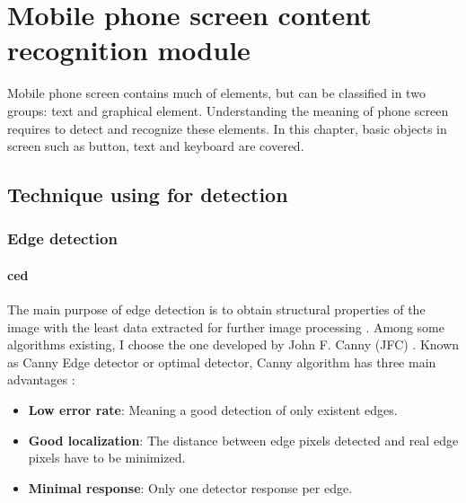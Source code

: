 \chapter{Mobile phone screen content recognition module}
\label{ch:screen_recognize}
Mobile phone screen contains much of elements, but can be classified in two groups: text and graphical element.
Understanding the meaning of phone screen requires to detect and recognize these elements.
In this chapter, basic objects in screen such as button, text and keyboard are covered.

\section{Technique using for detection}
\subsection{Edge detection}
\subsubsection{\acrfull{ced}}
The main purpose of edge detection is to obtain structural properties of the image with the least data extracted for further image processing \cite{canny}. Among some algorithms existing, I choose the one developed by John F. Canny (JFC) \nocite{jfc_canny}. Known as Canny Edge detector or optimal detector, Canny algorithm has three main advantages \cite{code_canny}:
	\begin{itemize}
		\item \textbf{Low error rate}: Meaning a good detection of only existent edges.
		\item \textbf{Good localization}: The distance between edge pixels detected and real edge pixels have to be minimized.
		\item \textbf{Minimal response}: Only one detector response per edge.
	\end{itemize}

